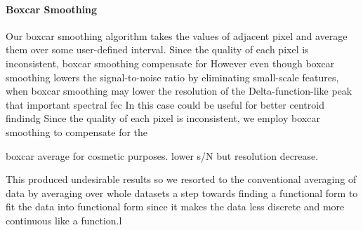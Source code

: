 \documentclass[authoryear, 12pt,5p, times]{elsarticle}
\begin{document}
  \paragraph*{\textbf{Boxcar Smoothing}}
  Our boxcar smoothing algorithm takes the values of adjacent pixel and average them over some user-defined interval. Since the quality of each pixel is inconsistent, boxcar smoothing compensate for 
  However even though boxcar smoothing lowers the signal-to-noise ratio by eliminating small-scale features, when 
  boxcar smoothing may lower the resolution of the Delta-function-like peak that  important spectral fec
  In this case could be useful for better centroid findindg 
Since the quality of each pixel is inconsistent, we employ boxcar smoothing to compensate for the 



  
   boxcar average for cosmetic purposes. lower s/N but resolution decrease. 
   
This produced undesirable results so we resorted to the conventional averaging of data by averaging over whole datasets
  a step towards finding a functional form to fit the data  into functional form since it makes the data less discrete and more continuous like a function.l
\end{document}
